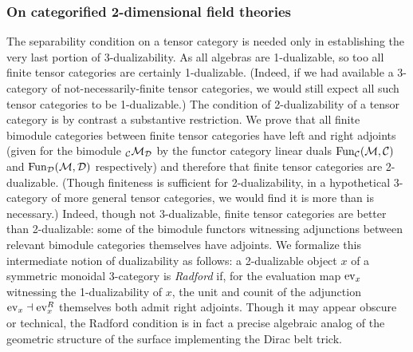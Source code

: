 \documentclass{amsart}
\begin{document}
\subsubsection{On categorified 2-dimensional field theories}

The separability condition on a tensor category is needed only in establishing the very last portion of 3-dualizability.  As all algebras are 1-dualizable, so too all finite tensor categories are certainly 1-dualizable.  (Indeed, if we had available a 3-category of not-necessarily-finite tensor categories, we would still expect all such tensor categories to be 1-dualizable.)  The condition of 2-dualizability of a tensor category is by contrast a substantive restriction.  We prove that all finite bimodule categories between finite tensor categories have left and right adjoints (given for the bimodule ${}_\mathcal C \mathcal M_\mathcal D$ by the functor category linear duals $\operatorname{Fun}_\mathcal C(\mathcal M,\mathcal C)$ and $\operatorname{Fun}_\mathcal D(\mathcal M,\mathcal D)$ respectively) and therefore that finite tensor categories are 2-dualizable.  (Though finiteness is sufficient for 2-dualizability, in a hypothetical 3-category of more general tensor categories, we would find it is more than is necessary.)  Indeed, though not 3-dualizable, finite tensor categories are better than 2-dualizable: some of the bimodule functors witnessing adjunctions between relevant bimodule categories themselves have adjoints.  We formalize this intermediate notion of dualizability as follows: a 2-dualizable object $x$ of a symmetric monoidal 3-category is \emph{Radford} if, for the evaluation map $\mathrm{ev}_x$ witnessing the 1-dualizability of $x$, the unit and counit of the adjunction $\mathrm{ev}_x \dashv \mathrm{ev}_x^R$ themselves both admit right adjoints.  Though it may appear obscure or technical, the Radford condition is in fact a precise algebraic analog of the geometric structure of the surface implementing the Dirac belt trick.
\end{document}
